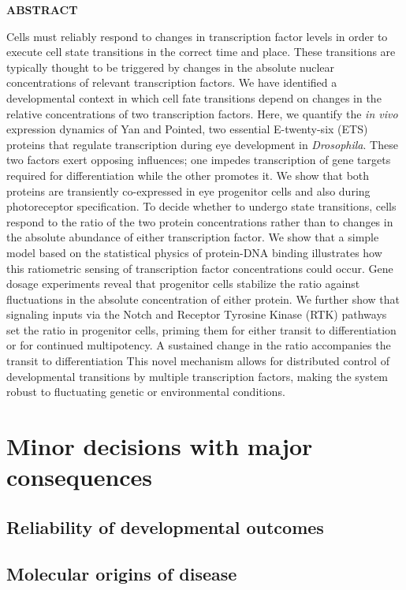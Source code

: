 

\textbf{ABSTRACT}

Cells must reliably respond to changes in transcription factor levels in order to execute cell state transitions in the correct time and place. These transitions are typically thought to be triggered by changes in the absolute nuclear concentrations of relevant transcription factors. We have identified a developmental context in which cell fate transitions depend on changes in the relative concentrations of two transcription factors. Here, we quantify the \emph{in vivo} expression dynamics of Yan and Pointed, two essential E-twenty-six (ETS) proteins that regulate transcription during eye development in \emph{Drosophila}. These two factors exert opposing influences; one impedes transcription of gene targets required for differentiation while the other promotes it. We show that both proteins are transiently co-expressed in eye progenitor cells and also during photoreceptor specification. To decide whether to undergo state transitions, cells respond to the ratio of the two protein concentrations rather than to changes in the absolute abundance of either transcription factor. We show that a simple model based on the statistical physics of protein-DNA binding illustrates how this ratiometric sensing of transcription factor concentrations could occur. Gene dosage experiments reveal that progenitor cells stabilize the ratio against fluctuations in the absolute concentration of either protein. We further show that signaling inputs via the Notch and Receptor Tyrosine Kinase (RTK) pathways set the ratio in progenitor cells, priming them for either transit to differentiation or for continued multipotency. A sustained change in the ratio accompanies the transit to differentiation This novel mechanism allows for distributed control of developmental transitions by multiple transcription factors, making the system robust to fluctuating genetic or environmental conditions.



\section{Minor decisions with major consequences}

	\subsection{Reliability of developmental outcomes}	
	\subsection{Molecular origins of disease}

